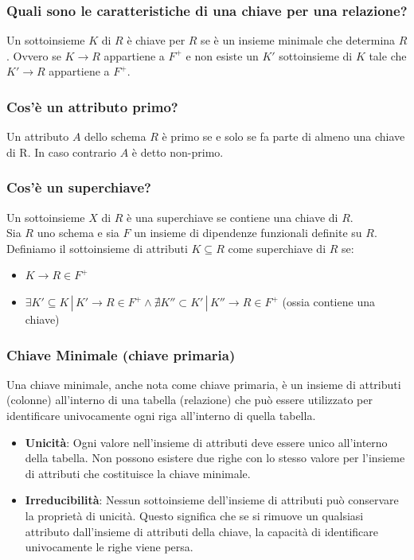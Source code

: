 \documentclass{article}
\begin{document}
\subsubsection{Quali sono le caratteristiche di una chiave per una relazione?}
Un sottoinsieme $K$ di $R$ è chiave per $R$ se è un insieme minimale che determina $R$. Ovvero se $K \rightarrow R$ appartiene a $F^+$ e non esiste un $K'$ sottoinsieme di $K$ tale che $K' \rightarrow R$ appartiene a $F^+$.\\

\subsubsection{Cos'è un attributo primo?}
Un attributo $A$ dello schema $R$ è primo se e solo se fa parte di almeno una chiave di R. In caso contrario $A$ è detto non-primo.\\

\subsubsection{Cos'è un superchiave?}
Un sottoinsieme $X$ di $R$ è una superchiave se contiene una chiave di $R$.\\

Sia $R$ uno schema e sia $F$ un insieme di dipendenze funzionali definite su $R$. Definiamo il sottoinsieme di attributi $K \subseteq R$ come superchiave di $R$ se:
\begin{itemize}
    \item $K \rightarrow R \in F^+$
    \item $\exists K' \subseteq K \,|\, K' \rightarrow R \in F^+ \land \nexists K'' \subset K' \,|\, K'' \rightarrow R \in F^+$ (ossia contiene una chiave)
\end{itemize}

\subsubsection{Chiave Minimale (chiave primaria)}
Una chiave minimale, anche nota come chiave primaria, è un insieme di attributi (colonne) all'interno di una tabella (relazione) che può essere utilizzato per identificare univocamente ogni riga all'interno di quella tabella.
\begin{itemize}
  \item \textbf{Unicità}: Ogni valore nell'insieme di attributi deve essere unico all'interno della tabella. Non possono esistere due righe con lo stesso valore per l'insieme di attributi che costituisce la chiave minimale.
  \item \textbf{Irreducibilità}: Nessun sottoinsieme dell'insieme di attributi può conservare la proprietà di unicità. Questo significa che se si rimuove un qualsiasi attributo dall'insieme di attributi della chiave, la capacità di identificare univocamente le righe viene persa.
\end{itemize}
\end{document}
